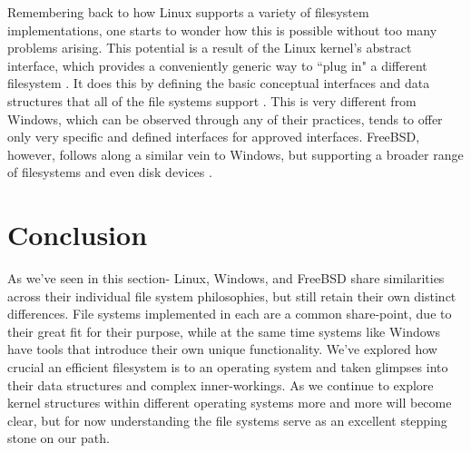 \documentclass[10pt,draftclsnofoot,onecolumn]{IEEEtran}
\begin{document}
\par Remembering back to how Linux supports a variety of filesystem implementations, one starts to wonder how this is possible without too many problems arising.
This potential is a result of the Linux kernel's abstract interface, which provides a conveniently generic way to ``plug in" a different filesystem \cite{linux:1}.
It does this by defining the basic conceptual interfaces and data structures that all of the file systems support \cite{linux:1}.
This is very different from Windows, which can be observed through any of their practices, tends to offer only very specific and defined interfaces for approved interfaces.
FreeBSD, however, follows along a similar vein to Windows, but supporting a broader range of filesystems and even disk devices \cite{bsd:1}.


\section{Conclusion}
\label{sec:Conclusion} %
\par As we've seen in this section- Linux, Windows, and FreeBSD share similarities across their individual file system philosophies, but still retain their own distinct differences.
File systems implemented in each are a common share-point, due to their great fit for their purpose, while at the same time systems like Windows have tools that introduce their own unique functionality.
We've explored how crucial an efficient filesystem is to an operating system and taken glimpses into their data structures and complex inner-workings.
As we continue to explore kernel structures within different operating systems more and more will become clear, but for now understanding the file systems serve as an excellent stepping stone on our path.

%
%
%



\end{document}
